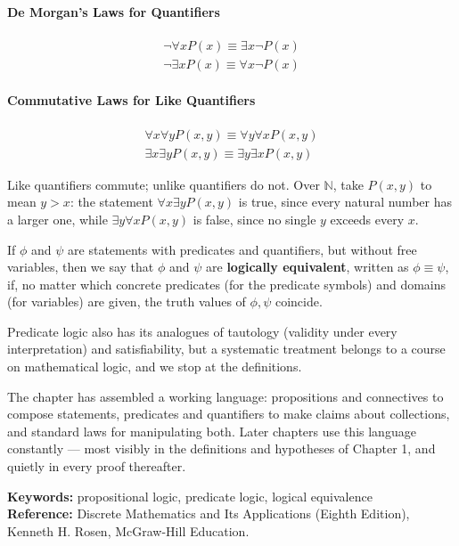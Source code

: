 \paragraph{De Morgan's Laws for Quantifiers}
\begin{align*}
    \neg \forall x P(x) \equiv \exists x \neg P(x) \\
    \neg \exists x P(x) \equiv \forall x \neg P(x)
\end{align*}

\paragraph{Commutative Laws for Like Quantifiers}
\begin{align*}
    \forall x \forall y P(x,y) \equiv \forall y \forall x P(x,y) \\
    \exists x \exists y P(x,y) \equiv \exists y \exists x P(x,y)
\end{align*}



\begin{note}
Like quantifiers commute; unlike quantifiers do not. Over $\mathbb{N}$, take $P(x,y)$ to mean $y > x$: the statement $\forall x \exists y P(x,y)$ is true, since every natural number has a larger one, while $\exists y \forall x P(x,y)$ is false, since no single $y$ exceeds every $x$.
\end{note}

\begin{definition}
If $\phi$ and $\psi$ are statements with predicates and quantifiers, but without free variables, then we say that $\phi$ and $\psi$ are \textbf{logically equivalent}, written as $\phi \equiv \psi$, if, no matter which concrete predicates (for the predicate symbols) and domains (for variables) are given, the truth values of $\phi, \psi$ coincide.
\end{definition}

Predicate logic also has its analogues of tautology (validity under every interpretation) and satisfiability, but a systematic treatment belongs to a course on mathematical logic, and we stop at the definitions.

The chapter has assembled a working language: propositions and connectives to compose statements, predicates and quantifiers to make claims about collections, and standard laws for manipulating both. Later chapters use this language constantly — most visibly in the definitions and hypotheses of Chapter 1, and quietly in every proof thereafter.

\vspace{1cm}
\noindent
\textbf{Keywords:} propositional logic, predicate logic, logical equivalence \\
\textbf{Reference:} Discrete Mathematics and Its Applications (Eighth Edition), Kenneth H. Rosen, McGraw-Hill Education.

\cleardoublepage